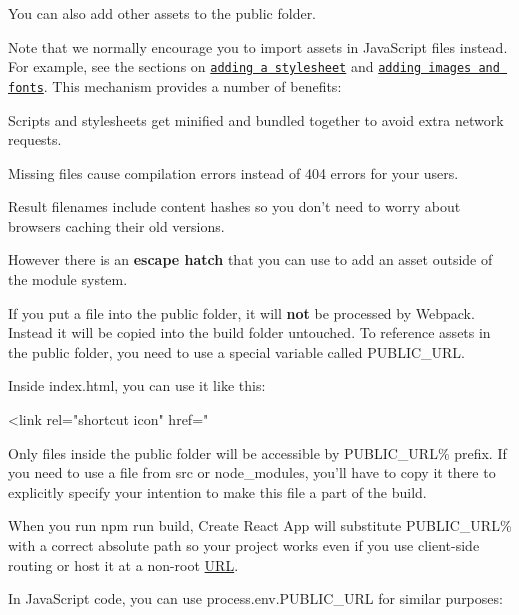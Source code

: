 You can also add other assets to the {\ttfamily public} folder.

Note that we normally encourage you to {\ttfamily import} assets in Java\+Script files instead. For example, see the sections on \href{#adding-a-stylesheet}{\tt adding a stylesheet} and \href{#adding-images-fonts-and-files}{\tt adding images and fonts}. This mechanism provides a number of benefits\+:


\begin{DoxyItemize}
\item Scripts and stylesheets get minified and bundled together to avoid extra network requests.
\item Missing files cause compilation errors instead of 404 errors for your users.
\item Result filenames include content hashes so you don’t need to worry about browsers caching their old versions.
\end{DoxyItemize}

However there is an {\bfseries escape hatch} that you can use to add an asset outside of the module system.

If you put a file into the {\ttfamily public} folder, it will {\bfseries not} be processed by Webpack. Instead it will be copied into the build folder untouched. To reference assets in the {\ttfamily public} folder, you need to use a special variable called {\ttfamily P\+U\+B\+L\+I\+C\+\_\+\+U\+RL}.

Inside {\ttfamily index.\+html}, you can use it like this\+:


\begin{DoxyCode}
<link rel="shortcut icon" href="%
\end{DoxyCode}


Only files inside the {\ttfamily public} folder will be accessible by {\ttfamily P\+U\+B\+L\+I\+C\+\_\+\+U\+RL\%} prefix. If you need to use a file from {\ttfamily src} or {\ttfamily node\+\_\+modules}, you’ll have to copy it there to explicitly specify your intention to make this file a part of the build.

When you run {\ttfamily npm run build}, Create React App will substitute {\ttfamily P\+U\+B\+L\+I\+C\+\_\+\+U\+RL\%} with a correct absolute path so your project works even if you use client-\/side routing or host it at a non-\/root \mbox{\hyperlink{namespace_u_r_l}{U\+RL}}.

In Java\+Script code, you can use {\ttfamily process.\+env.\+P\+U\+B\+L\+I\+C\+\_\+\+U\+RL} for similar purposes\+:


